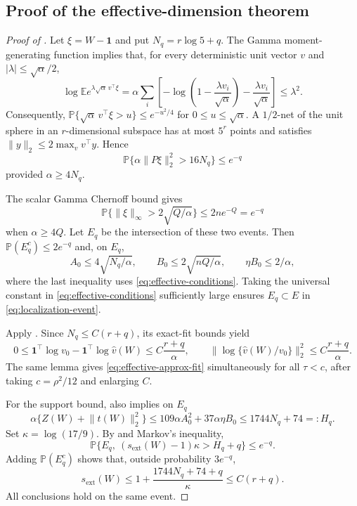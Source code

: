 \documentclass[11pt]{article}
\theoremstyle{definition}
\theoremstyle{remark}
\newcommand{\EE}{\mathbb E}
\newcommand{\PP}{\mathbb P}
\newcommand{\one}{\bm 1}
\newcommand{\norm}[1]{\lVert #1\rVert}
\newcommand{\abs}[1]{\lvert #1\rvert}
\newcommand{\vhat}{\widehat v}
\begin{document}
\subsection{Proof of the effective-dimension theorem}

\begin{proof}[Proof of ]
Let $\xi=W-\one$ and put $N_q=r\log5+q$.  The Gamma moment-generating
function implies that, for every deterministic unit vector $v$ and
$\abs{\lambda}\le\sqrt\alpha/2$,
\[
 \log\EE e^{\lambda\sqrt\alpha\,v^\top\xi}
 =\alpha\sum_i\left[-\log\left(1-\frac{\lambda v_i}{\sqrt\alpha}\right)
 -\frac{\lambda v_i}{\sqrt\alpha}\right]\le\lambda^2.
\]
Consequently,
$\PP\{\sqrt\alpha\,v^\top\xi>u\}\le e^{-u^2/4}$ for
$0\le u\le\sqrt\alpha$.  A $1/2$-net of the unit sphere in an
$r$-dimensional subspace has at most $5^r$ points and satisfies
$\norm{y}_2\le2\max_v v^\top y$.  Hence
\begin{equation}\label{eq:proj-concentration}
 \PP\{\alpha\norm{P\xi}_2^2>16N_q\}\le e^{-q}
\end{equation}
provided $\alpha\ge4N_q$.

The scalar Gamma Chernoff bound gives
\[
 \PP\{\norm{\xi}_\infty>2\sqrt{Q/\alpha}\}
 \le2n e^{-Q}=e^{-q}
\]
when $\alpha\ge4Q$.  Let $E_q$ be the intersection of these two events.
Then $\PP(E_q^c)\le2e^{-q}$ and, on $E_q$,
\[
 A_0\le4\sqrt{N_q/\alpha},\qquad
 B_0\le2\sqrt{nQ/\alpha},\qquad
 \eta B_0\le2/\alpha,
\]
where the last inequality uses \eqref{eq:effective-conditions}.  Taking the
universal constant in \eqref{eq:effective-conditions} sufficiently large
ensures $E_q\subset E$ in \eqref{eq:localization-event}.

Apply .  Since $N_q\le C(r+q)$, its exact-fit bounds yield
\[
 0\le\one^\top\log v_0-\one^\top\log\vhat(W)
 \le C\frac{r+q}{\alpha},
 \qquad
 \norm{\log\{\vhat(W)/v_0\}}_2^2
 \le C\frac{r+q}{\alpha}.
\]
The same lemma gives \eqref{eq:effective-approx-fit} simultaneously for all
$\tau<c$, after taking $c=\rho^2/12$ and enlarging $C$.

For the support bound,  also implies on $E_q$
\[
 \alpha\{Z(W)+\norm{t(W)}_2^2\}
 \le109\alpha A_0^2+37\alpha\eta B_0
 \le1744N_q+74=:H_q.
\]
Set $\kappa=\log(17/9)$.  By  and Markov's
inequality,
\[
 \PP\{E_q,\ (s_{\mathrm{ext}}(W)-1)\kappa>H_q+q\}\le e^{-q}.
\]
Adding $\PP(E_q^c)$ shows that, outside probability $3e^{-q}$,
\[
 s_{\mathrm{ext}}(W)
 \le1+\frac{1744N_q+74+q}{\kappa}
 \le C(r+q).
\]
All conclusions hold on the same event.
\end{proof}
\end{document}
